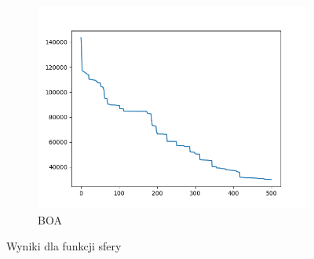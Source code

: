 \documentclass[12pt]{article}
\begin{document}
\begin{figure}[H]
\begin{subfigure}{0.32\textwidth}
        \includegraphics[width=\linewidth]{plots/BOA/sphere.png}
        \caption{BOA}
    \end{subfigure}
    \caption{Wyniki dla funkcji sfery}
\end{figure}
\end{document}

